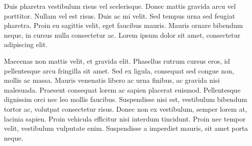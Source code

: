 Duis pharetra vestibulum risus vel scelerisque. Donec mattis gravida arcu vel porttitor. Nullam vel est risus. Duis ac mi velit. Sed tempus urna sed feugiat pharetra. Proin eu sagittis velit, eget faucibus mauris. Mauris ornare bibendum neque, in cursus nulla consectetur ac. Lorem ipsum dolor sit amet, consectetur adipiscing elit.

Maecenas non mattis velit, et gravida elit. Phasellus rutrum cursus eros, id pellentesque arcu fringilla sit amet. Sed ex ligula, consequat sed congue non, mollis ac massa. Mauris venenatis libero ac urna finibus, ac gravida nisi malesuada. Praesent consequat lorem ac sapien placerat euismod. Pellentesque dignissim orci nec leo mollis faucibus. Suspendisse nisi est, vestibulum bibendum tortor ac, volutpat consectetur risus. Donec non ex vestibulum, semper lorem at, lacinia sapien. Proin vehicula efficitur nisi interdum tincidunt. Proin nec tempor velit, vestibulum vulputate enim. Suspendisse a imperdiet mauris, sit amet porta neque.
